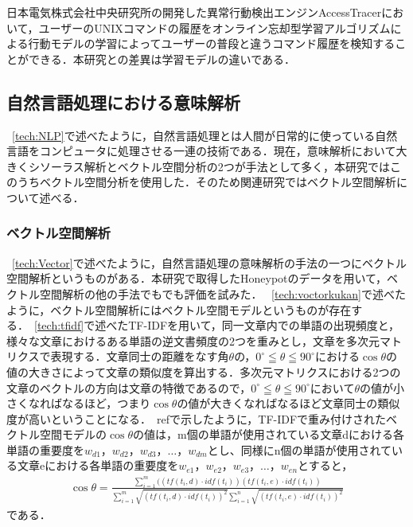 日本電気株式会社中央研究所の開発した異常行動検出エンジンAccessTracer\cite{AccessTracer}において，ユーザーのUNIXコマンドの履歴をオンライン忘却型学習アルゴリズムによる行動モデルの学習によってユーザーの普段と違うコマンド履歴を検知することができる．本研究との差異は学習モデルの違いである．

\subsection{自然言語処理における意味解析}
~\ref{tech:NLP}で述べたように，自然言語処理とは人間が日常的に使っている自然言語をコンピュータに処理させる一連の技術である．現在，意味解析において大きくシソーラス解析とベクトル空間分析の2つが手法として多く，本研究ではこのうちベクトル空間分析を使用した．そのため関連研究ではベクトル空間解析について述べる．
\subsubsection{ベクトル空間解析}
~\ref{tech:Vector}で述べたように，自然言語処理の意味解析の手法の一つにベクトル空間解析というものがある．本研究で取得したHoneypotのデータを用いて，ベクトル空間解析の他の手法でもでも評価を試みた．
~\ref{tech:voctorkukan}で述べたように，ベクトル空間解析にはベクトル空間モデルというものが存在する．~\ref{tech:tfidf}で述べたTF-IDFを用いて，同一文章内での単語の出現頻度と，様々な文章におけるある単語の逆文書頻度の2つを重みとし，文章を多次元マトリクスで表現する．文章同士の距離をなす角$ \theta $の，$ 0^\circ \leqq \theta \leqq 90^\circ $における$ \cos \theta $の値の大きさによって文章の類似度を算出する．多次元マトリクスにおける2つの文章のベクトルの方向は文章の特徴であるので，$ 0^\circ \leqq \theta \leqq 90^\circ $において$ \theta $の値が小さくなればなるほど，つまり$ \cos \theta $の値が大きくなればなるほど文章同士の類似度が高いということになる．~ref{}で示したように，TF-IDFで重み付けされたベクトル空間モデルの$ \cos \theta $の値は，m個の単語が使用されている文章dにおける各単語の重要度を$ w_{d1}，w_{d2}，w_{d3}， \ldots ，w_{dm} $とし、同様にn個の単語が使用されている文章eにおける各単語の重要度を$ w_{e1}，w_{e2}，w_{e3}， \ldots ，w_{en} $とすると，\\
\begin{align}
\cos \theta = \frac{ \sum_{i=1}^{m} ((tf(t_{i},d) \cdot idf(t_{i}))(tf(t_{i},e) \cdot idf(t_{i}))}{\sum_{i=1}^{m} \sqrt{(tf(t_{i},d) \cdot idf(t_{i}))^2} \sum_{i=1}^{n} \sqrt{(tf(t_{i},e) \cdot idf(t_{i}))^2}} \nonumber
\end{align}
である．

